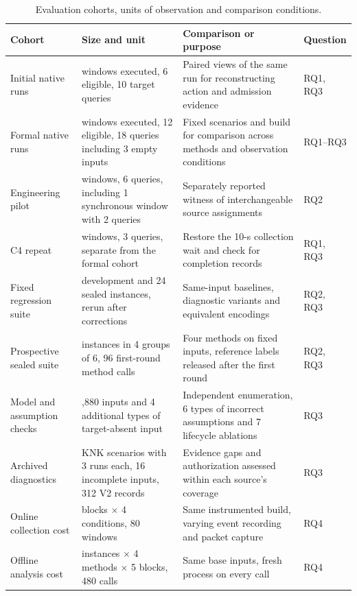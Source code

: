 \begin{table}[t]
\centering
\caption{Evaluation cohorts, units of observation and comparison conditions.}
\label{tab:3}
\small
\begin{tabularx}{\textwidth}{@{}>{\raggedright\arraybackslash}p{}>{\raggedright\arraybackslash}p{}>{\raggedright\arraybackslash}Xl@{}}
\toprule
Cohort & Size and unit & Comparison or purpose & Question \\
\midrule
Initial native runs & 12 windows executed, 6 eligible, 10 target queries & Paired views of the same run for reconstructing action and admission evidence & RQ1, RQ3 \\
Formal native runs & 15 windows executed, 12 eligible, 18 queries including 3 empty inputs & Fixed scenarios and build for comparison across methods and observation conditions & RQ1--RQ3 \\
Engineering pilot & 4 windows, 6 queries, including 1 synchronous window with 2 queries & Separately reported witness of interchangeable source assignments & RQ2 \\
C4 repeat & 3 windows, 3 queries, separate from the formal cohort & Restore the 10-s collection wait and check for completion records & RQ1, RQ3 \\
\addlinespace
Fixed regression suite & 24 development and 24 sealed instances, rerun after corrections & Same-input baselines, diagnostic variants and equivalent encodings & RQ2, RQ3 \\
Prospective sealed suite & 24 instances in 4 groups of 6, 96 first-round method calls & Four methods on fixed inputs, reference labels released after the first round & RQ2, RQ3 \\
Model and assumption checks & 26,880 inputs and 4 additional types of target-absent input & Independent enumeration, 6 types of incorrect assumptions and 7 lifecycle ablations & RQ3 \\
Archived diagnostics & 6 KNK scenarios with 3 runs each, 16 incomplete inputs, 312 V2 records & Evidence gaps and authorization assessed within each source's coverage & RQ3 \\
\addlinespace
Online collection cost & 20 blocks $\times$ 4 conditions, 80 windows & Same instrumented build, varying event recording and packet capture & RQ4 \\
Offline analysis cost & 24 instances $\times$ 4 methods $\times$ 5 blocks, 480 calls & Same base inputs, fresh process on every call & RQ4 \\
\bottomrule
\end{tabularx}
\end{table}

